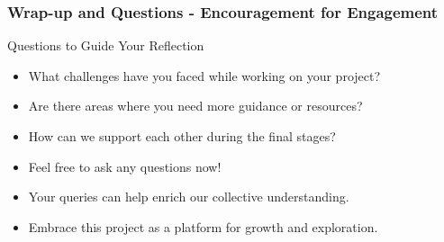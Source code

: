 \documentclass[aspectratio=169]{beamer}
\begin{document}
\begin{frame}[fragile]
    \frametitle{Wrap-up and Questions - Encouragement for Engagement}
    \begin{block}{Questions to Guide Your Reflection}
        \begin{itemize}
            \item What challenges have you faced while working on your project?
            \item Are there areas where you need more guidance or resources?
            \item How can we support each other during the final stages?
        \end{itemize}
    \end{block}
    
    \begin{itemize}
        \item Feel free to ask any questions now!
        \item Your queries can help enrich our collective understanding.
        \item Embrace this project as a platform for growth and exploration.
    \end{itemize}
\end{frame}
\end{document}
